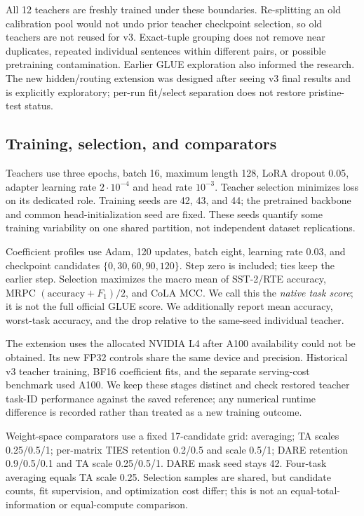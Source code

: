 \documentclass[11pt,a4paper]{article}
\begin{document}
All 12 teachers are freshly trained under these boundaries. Re-splitting an old calibration pool would not undo prior teacher checkpoint selection, so old teachers are not reused for v3. Exact-tuple grouping does not remove near duplicates, repeated individual sentences within different pairs, or possible pretraining contamination. Earlier GLUE exploration also informed the research. The new hidden/routing extension was designed after seeing v3 final results and is explicitly exploratory; per-run fit/select separation does not restore pristine-test status.

\subsection{Training, selection, and comparators}
Teachers use three epochs, batch 16, maximum length 128, LoRA dropout 0.05, adapter learning rate $2\cdot10^{-4}$ and head rate $10^{-3}$. Teacher selection minimizes loss on its dedicated role. Training seeds are 42, 43, and 44; the pretrained backbone and common head-initialization seed are fixed. These seeds quantify some training variability on one shared partition, not independent dataset replications.

Coefficient profiles use Adam, 120 updates, batch eight, learning rate 0.03, and checkpoint candidates $\{0,30,60,90,120\}$. Step zero is included; ties keep the earlier step. Selection maximizes the macro mean of SST-2/RTE accuracy, MRPC $(\mathrm{accuracy}+F_1)/2$, and CoLA MCC. We call this the \emph{native task score}; it is not the full official GLUE score. We additionally report mean accuracy, worst-task accuracy, and the drop relative to the same-seed individual teacher.

The extension uses the allocated NVIDIA L4 after A100 availability could not be obtained. Its new FP32 controls share the same device and precision. Historical v3 teacher training, BF16 coefficient fits, and the separate serving-cost benchmark used A100. We keep these stages distinct and check restored teacher task-ID performance against the saved reference; any numerical runtime difference is recorded rather than treated as a new training outcome.

Weight-space comparators use a fixed 17-candidate grid: averaging; TA scales 0.25/0.5/1; per-matrix TIES retention 0.2/0.5 and scale 0.5/1; DARE retention 0.9/0.5/0.1 and TA scale 0.25/0.5/1. DARE mask seed stays 42. Four-task averaging equals TA scale 0.25. Selection samples are shared, but candidate counts, fit supervision, and optimization cost differ; this is not an equal-total-information or equal-compute comparison.
\end{document}
